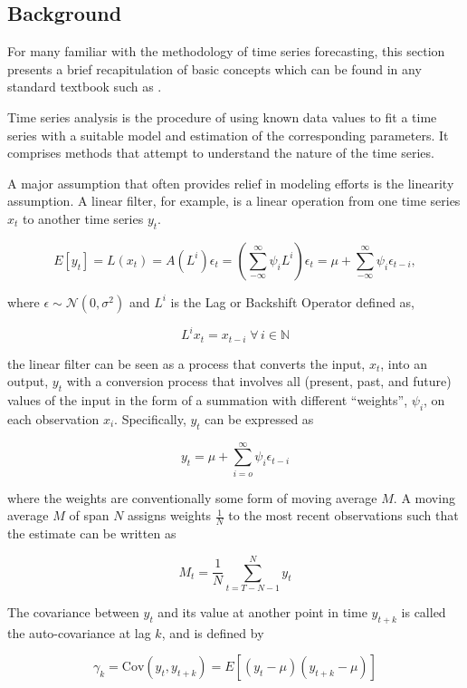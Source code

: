 \documentclass[
  11pt,
]{article}
\begin{document}
\hypertarget{background}{%
\subsection{Background}\label{background}}

For many familiar with the methodology of time series forecasting, this
section presents a brief recapitulation of basic concepts which can be
found in any standard textbook such as \cite{MJK}.

Time series analysis is the procedure of using known data values to fit
a time series with a suitable model and estimation of the corresponding
parameters. It comprises methods that attempt to understand the nature
of the time series.

A major assumption that often provides relief in modeling efforts is the
linearity assumption. A linear filter, for example, is a linear
operation from one time series \(x_{t}\) to another time series
\(y_{t}\).

\[
E[y_{t}] = L(x_{t}) = A(L^{i})\epsilon_{t} = \left(\sum\limits_{-\infty}^{\infty} \psi_{i}L^{i}\right)\epsilon_{t} = \mu + \sum\limits_{-\infty}^{\infty}\psi_{i}\epsilon_{t-i},
\]

where \(\epsilon \sim \mathcal{N}(0, \sigma^{2})\) and \(L^{i}\) is the
Lag or Backshift Operator defined as,

\[
L^{i}x_{t} = x_{t-i} \; \forall \, i \in \mathbb{N}
\]

the linear filter can be seen as a process that converts the input,
\(x_{t}\), into an output, \(y_{t}\) with a conversion process that
involves all (present, past, and future) values of the input in the form
of a summation with different ``weights'', \(\psi_{i}\), on each
observation \(x_{i}\). Specifically, \(y_{t}\) can be expressed as

\[
y_{t} = \mu + \sum\limits_{i= o}^{\infty}\psi_{i}\epsilon_{t-i}
\]

where the weights are conventionally some form of moving average \(M\).
A moving average \(M\) of span \(N\) assigns weights \(\frac{1}{N}\) to
the most recent observations such that the estimate can be written as

\[
M_{t} = \frac{1}{N} \sum\limits_{t = T - N - 1}^{N} y_{t}
\]

The covariance between \(y_{t}\) and its value at another point in time
\(y_{t + k}\) is called the auto-covariance at lag \(k\), and is defined
by

\[
\gamma_{k} = \mathrm{Cov}(y_{t}, y_{t+k}) = E\left[(y_{t} - \mu)(y_{t+k} - \mu)\right]
\]
\end{document}
